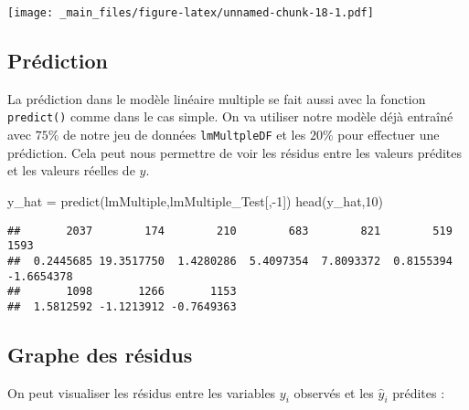 \documentclass[
]{book}
\newenvironment{Shaded}{\begin{snugshade}}{\end{snugshade}}
\newcommand{\DecValTok}[1]{\textcolor[rgb]{0.00,0.00,0.81}{#1}}
\newcommand{\FunctionTok}[1]{\textcolor[rgb]{0.00,0.00,0.00}{#1}}
\newcommand{\NormalTok}[1]{#1}
\newcommand{\OtherTok}[1]{\textcolor[rgb]{0.56,0.35,0.01}{#1}}
\newcommand{\SpecialCharTok}[1]{\textcolor[rgb]{0.00,0.00,0.00}{#1}}
\begin{document}
\texttt{[image: \_main\_files/figure-latex/unnamed-chunk-18-1.pdf]}

\hypertarget{pruxe9diction-1}{%
\subsection*{Prédiction}\label{pruxe9diction-1}}

La prédiction dans le modèle linéaire multiple se fait aussi avec la fonction \texttt{predict()} comme dans le cas simple. On va utiliser notre modèle déjà entraîné avec \(75\%\) de notre jeu de données \texttt{lmMultpleDF} et les \(20\%\) pour effectuer une prédiction. Cela peut nous permettre de voir les résidus entre les valeurs prédites et les valeurs réelles de \(y\).

\begin{Shaded}
\begin{Highlighting}[]
\NormalTok{y\_hat }\OtherTok{=} \FunctionTok{predict}\NormalTok{(lmMultiple,lmMultiple\_Test[,}\SpecialCharTok{{-}}\DecValTok{1}\NormalTok{])}
\FunctionTok{head}\NormalTok{(y\_hat,}\DecValTok{10}\NormalTok{)}
\end{Highlighting}
\end{Shaded}

\begin{verbatim}
##       2037        174        210        683        821        519       1593 
##  0.2445685 19.3517750  1.4280286  5.4097354  7.8093372  0.8155394 -1.6654378 
##       1098       1266       1153 
##  1.5812592 -1.1213912 -0.7649363
\end{verbatim}

\hypertarget{graphe-des-ruxe9sidus}{%
\subsection{Graphe des résidus}\label{graphe-des-ruxe9sidus}}

On peut visualiser les résidus entre les variables \(y_i\) observés et les \(\hat y_i\) prédites :
\end{document}
